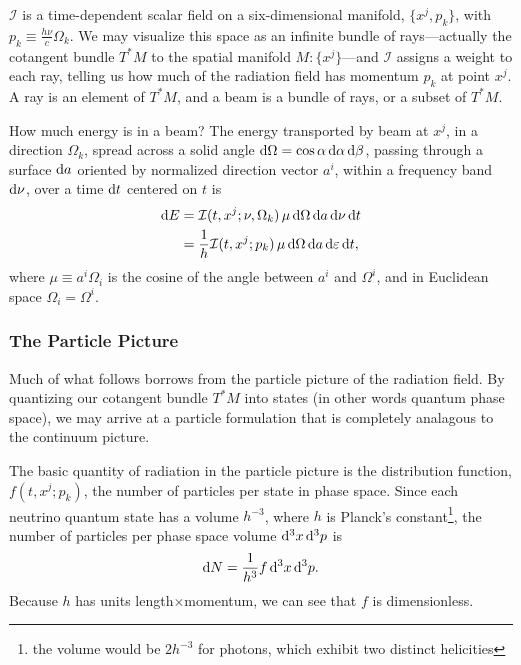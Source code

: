 $\mathcal{I}$ is a time-dependent scalar field on a six-dimensional manifold,
$\{x^j,p_k\}$, with $p_k\equiv\frac{h\nu}{c}\Omega_k$.
We may visualize this space as an infinite bundle of rays---actually the
cotangent bundle $T^*M$ to the spatial manifold $M:\{x^j\}$---and $\mathcal{I}$
assigns a weight to each ray, telling us how much of the radiation field has
momentum $p_k$ at point $x^j$. A ray is an element of $T^*M$,
and a beam is a bundle of rays, or a subset of $T^*M$.

How much energy is in a beam?
The energy transported by beam at $x^j$,
in a direction $\Omega_k$,
spread across a solid angle $\mathrm{d}\Omega=\cos\alpha\,\mathrm{d}\alpha\,\mathrm{d}\beta$,
passing through a surface $\mathrm{d} a$
oriented by normalized direction vector $a^i$,
within a frequency band $\mathrm{d} \nu$,
over a time $\mathrm{d} t$ centered on $t$ is
\begin{align}
  \label{eqn:beam_energy_I_nu}
  \mathrm{d} E &= \mathcal{I}(t,x^j;\nu,\Omega_k)\,
  \mu\, \mathrm{d}\Omega\, \mathrm{d} a\, \mathrm{d}\nu\, \mathrm{d} t \\
  \label{eqn:beam_energy_I_eps}
  &= \frac{1}{h} \mathcal{I}(t,x^j;p_k)\,
  \mu\, \mathrm{d}\Omega\, \mathrm{d} a\, \mathrm{d}\varepsilon\, \mathrm{d} t,
\end{align}
where $\mu\equiv a^i\Omega_i$ is the cosine of the angle between $a^i$ and
$\Omega^i$, and in Euclidean space $\Omega_i=\Omega^i$.

\subsubsection{The Particle Picture}
Much of what follows borrows from the particle picture of the radiation field.
By quantizing our cotangent bundle $T^*M$ into states (in other words
quantum phase space), we may arrive at a particle formulation that is completely
analagous to the continuum picture.

The basic quantity of radiation in the particle picture is the distribution
function, $f(t,x^j;p_k)$, the number of particles per state in phase space.
Since each neutrino quantum state has a volume $h^{-3}$, where $h$ is Planck's
constant\footnote{the volume would be $2h^{-3}$ for photons, which exhibit two
distinct helicities},
the number of particles per phase space volume $\mathrm{d}^3x\,\mathrm{d}^3p$ is
\begin{equation}
  \mathrm{d} N = \frac{1}{h^3} f \,\mathrm{d}^3 x\, \mathrm{d}^3p.
\end{equation}
Because $h$ has units length$\times$momentum, we can see that $f$ is
dimensionless.

